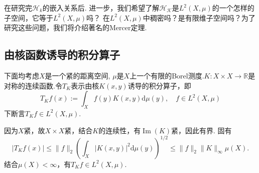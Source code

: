 \documentclass[12pt, a4paper, oneside]{ctexbook}
\begin{document}
在研究完$\mathcal{H}_k$的嵌入关系后. 进一步，我们希望了解$\mathcal{H_K}$是$L^2(X,\mu)$的一个怎样的子空间，它等于$L^2(X,\mu)$吗？ 在$L^2(X,\mu)$中稠密吗？是有限维子空间吗？为了研究这些问题，我们将介绍著名的Mercer定理.

\subsection{由核函数诱导的积分算子}
下面均考虑$X$是一个紧的距离空间, $\mu$是$X$上一个有限的Borel测度.$K:X\times X\to\mathbb{R}$是对称的连续函数.令$T_K$表示由核$K(x,y)$诱导的积分算子，即
\begin{equation*}
    T_Kf(x):=\int_X f(y)K(x,y)\mathrm{d}\mu(y),\quad f\in L^2(X,\mu)
\end{equation*}
下断言$T_Kf\in L^2(X,\mu)$.

因为$X$紧，故$X\times X$紧，结合$K$的连续性，有$\operatorname{Im}(K)$紧，因此有界. 固有
\begin{equation*}
    \left|T_Kf(x)\right|\leq \|f\|_2\left(\int_X |K(x,y)|^2\mathrm{d}\mu(y)\right)^{1/2}\leq \|f\|_2\|K\|_\infty \mu(X).
\end{equation*}
结合$\mu(X)<\infty$，有$T_Kf\in L^2(X,\mu)$.
\end{document}
